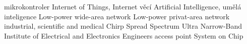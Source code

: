 \def\ctustyle{{\ssr CTUstyle}}
\def\ttb{\tt\char`\\} %

 {mikrokontroler}
 {Internet of Things, Internet věcí}
 {Artificial Intelligence, umělá inteligence}
 {Low-power wide-area network}
 {Low-power privat-area network}
 {industrial, scientific and medical}
 {Chirp Spread Spectrum}
 {Ultra Narrow-Band}
 {Institute of Electrical and Electronics Engineers}
 {access point}
 {System on Chip}
\makeglos
